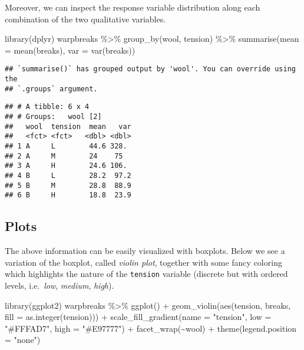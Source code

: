 \documentclass[
  oneside]{book}
\newenvironment{Shaded}{\begin{snugshade}}{\end{snugshade}}
\newcommand{\AttributeTok}[1]{\textcolor[rgb]{0.77,0.63,0.00}{#1}}
\newcommand{\FunctionTok}[1]{\textcolor[rgb]{0.00,0.00,0.00}{#1}}
\newcommand{\NormalTok}[1]{#1}
\newcommand{\SpecialCharTok}[1]{\textcolor[rgb]{0.00,0.00,0.00}{#1}}
\newcommand{\StringTok}[1]{\textcolor[rgb]{0.31,0.60,0.02}{#1}}
\begin{document}
Moreover, we can inspect the response variable distribution
along each combination of the two qualitative variables.

\begin{Shaded}
\begin{Highlighting}[]
\FunctionTok{library}\NormalTok{(dplyr)}
\NormalTok{warpbreaks }\SpecialCharTok{\%\textgreater{}\%}
  \FunctionTok{group\_by}\NormalTok{(wool, tension) }\SpecialCharTok{\%\textgreater{}\%}
  \FunctionTok{summarise}\NormalTok{(}\AttributeTok{mean =} \FunctionTok{mean}\NormalTok{(breaks), }\AttributeTok{var =} \FunctionTok{var}\NormalTok{(breaks))}
\end{Highlighting}
\end{Shaded}

\begin{verbatim}
## `summarise()` has grouped output by 'wool'. You can override using the
## `.groups` argument.
\end{verbatim}

\begin{verbatim}
## # A tibble: 6 x 4
## # Groups:   wool [2]
##   wool  tension  mean   var
##   <fct> <fct>   <dbl> <dbl>
## 1 A     L        44.6 328. 
## 2 A     M        24    75  
## 3 A     H        24.6 106. 
## 4 B     L        28.2  97.2
## 5 B     M        28.8  88.9
## 6 B     H        18.8  23.9
\end{verbatim}

\hypertarget{plots-1}{%
\subsection{Plots}\label{plots-1}}

The above information can be easily visualized with
boxplots. Below we see a variation of the boxplot, called
\emph{violin plot}, together with some fancy coloring which
highlights the nature of the \texttt{tension} variable (discrete
but with ordered levels, i.e.~\emph{low}, \emph{medium}, \emph{high}).

\begin{Shaded}
\begin{Highlighting}[]
\FunctionTok{library}\NormalTok{(ggplot2)}
\NormalTok{warpbreaks }\SpecialCharTok{\%\textgreater{}\%}
  \FunctionTok{ggplot}\NormalTok{() }\SpecialCharTok{+}
  \FunctionTok{geom\_violin}\NormalTok{(}\FunctionTok{aes}\NormalTok{(tension, breaks, }\AttributeTok{fill =} \FunctionTok{as.integer}\NormalTok{(tension))) }\SpecialCharTok{+}
  \FunctionTok{scale\_fill\_gradient}\NormalTok{(}\AttributeTok{name =} \StringTok{"tension"}\NormalTok{, }\AttributeTok{low =} \StringTok{"\#FFFAD7"}\NormalTok{, }\AttributeTok{high =} \StringTok{"\#E97777"}\NormalTok{) }\SpecialCharTok{+}
  \FunctionTok{facet\_wrap}\NormalTok{(}\SpecialCharTok{\textasciitilde{}}\NormalTok{wool) }\SpecialCharTok{+}
  \FunctionTok{theme}\NormalTok{(}\AttributeTok{legend.position =} \StringTok{"none"}\NormalTok{)}
\end{Highlighting}
\end{Shaded}
\end{document}
